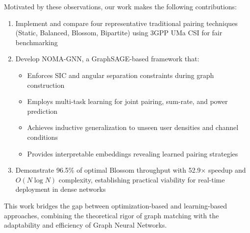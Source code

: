 Motivated by these observations, our work makes the following contributions:

\begin{enumerate}
    \item Implement and compare four representative traditional pairing techniques (Static, Balanced, Blossom, Bipartite) using 3GPP UMa CSI for fair benchmarking
    
    \item Develop NOMA-GNN, a GraphSAGE-based framework that:
    \begin{itemize}
        \item Enforces SIC and angular separation constraints during graph construction
        \item Employs multi-task learning for joint pairing, sum-rate, and power prediction
        \item Achieves inductive generalization to unseen user densities and channel conditions
        \item Provides interpretable embeddings revealing learned pairing strategies
    \end{itemize}
    
    \item Demonstrate 96.5\% of optimal Blossom throughput with 52.9× speedup and $O(N \log N)$ complexity, establishing practical viability for real-time deployment in dense networks
\end{enumerate}

This work bridges the gap between optimization-based and learning-based approaches, combining the theoretical rigor of graph matching with the adaptability and efficiency of Graph Neural Networks.
